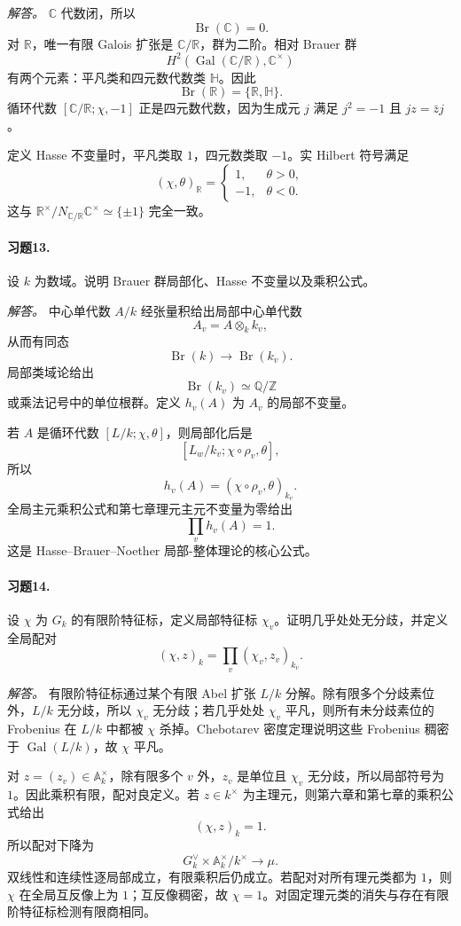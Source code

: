 \documentclass[11pt,a4paper,openany]{ctexbook}
\numberwithin{equation}{chapter}
\newcommand{\Q}{\mathbb{Q}}
\newcommand{\R}{\mathbb{R}}
\newcommand{\C}{\mathbb{C}}
\newcommand{\Z}{\mathbb{Z}}
\newcommand{\A}{\mathbb{A}}
\newcommand{\Gal}{\operatorname{Gal}}
\newcommand{\Br}{\operatorname{Br}}
\theoremstyle{plain}
\theoremstyle{definition}
\theoremstyle{remark}
\begin{document}
\emph{解答。}
$\C$ 代数闭，所以
\[
\Br(\C)=0.
\]
对 $\R$，唯一有限 Galois 扩张是 $\C/\R$，群为二阶。相对 Brauer 群
\[
H^2(\Gal(\C/\R),\C^\times)
\]
有两个元素：平凡类和四元数代数类 $\mathbb H$。因此
\[
\Br(\R)=\{\mathbb R,\mathbb H\}.
\]
循环代数 $[\C/\R;\chi,-1]$ 正是四元数代数，因为生成元 $j$ 满足 $j^2=-1$ 且 $jz=\bar z j$。

定义 Hasse 不变量时，平凡类取 $1$，四元数类取 $-1$。实 Hilbert 符号满足
\[
(\chi,\theta)_\R=
\begin{cases}
1,&\theta>0,\\
-1,&\theta<0.
\end{cases}
\]
这与 $\R^\times/N_{\C/\R}\C^\times\simeq\{\pm1\}$ 完全一致。

\paragraph{习题13.}
设 $k$ 为数域。说明 Brauer 群局部化、Hasse 不变量以及乘积公式。

\emph{解答。}
中心单代数 $A/k$ 经张量积给出局部中心单代数
\[
A_v=A\otimes_k k_v,
\]
从而有同态
\[
\Br(k)\to\Br(k_v).
\]
局部类域论给出
\[
\Br(k_v)\simeq \Q/\Z
\]
或乘法记号中的单位根群。定义 $h_v(A)$ 为 $A_v$ 的局部不变量。

若 $A$ 是循环代数 $[L/k;\chi,\theta]$，则局部化后是
\[
[L_w/k_v;\chi\circ\rho_v,\theta],
\]
所以
\[
h_v(A)=(\chi\circ\rho_v,\theta)_{k_v}.
\]
全局主元乘积公式和第七章理元主元不变量为零给出
\[
\prod_v h_v(A)=1.
\]
这是 Hasse--Brauer--Noether 局部-整体理论的核心公式。

\paragraph{习题14.}
设 $\chi$ 为 $G_k$ 的有限阶特征标，定义局部特征标 $\chi_v$。证明几乎处处无分歧，并定义全局配对
\[
(\chi,z)_k=\prod_v(\chi_v,z_v)_{k_v}.
\]

\emph{解答。}
有限阶特征标通过某个有限 Abel 扩张 $L/k$ 分解。除有限多个分歧素位外，$L/k$ 无分歧，所以 $\chi_v$ 无分歧；若几乎处处 $\chi_v$ 平凡，则所有未分歧素位的 Frobenius 在 $L/k$ 中都被 $\chi$ 杀掉。Chebotarev 密度定理说明这些 Frobenius 稠密于 $\Gal(L/k)$，故 $\chi$ 平凡。

对 $z=(z_v)\in\A_k^\times$，除有限多个 $v$ 外，$z_v$ 是单位且 $\chi_v$ 无分歧，所以局部符号为 $1$。因此乘积有限，配对良定义。若 $z\in k^\times$ 为主理元，则第六章和第七章的乘积公式给出
\[
(\chi,z)_k=1.
\]
所以配对下降为
\[
G_k^\vee\times \A_k^\times/k^\times\to \mu.
\]
双线性和连续性逐局部成立，有限乘积后仍成立。若配对对所有理元类都为 $1$，则 $\chi$ 在全局互反像上为 $1$；互反像稠密，故 $\chi=1$。对固定理元类的消失与存在有限阶特征标检测有限商相同。
\end{document}
